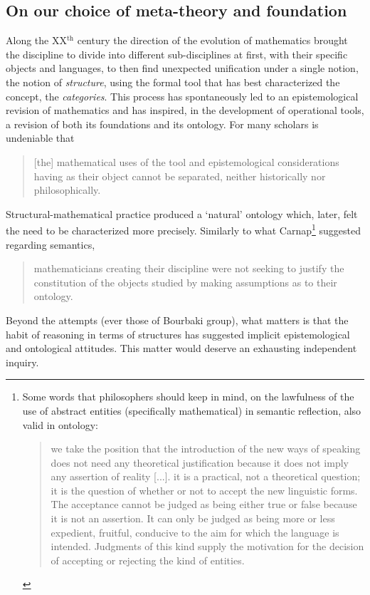 \subsection{On our choice of meta-theory and foundation}
Along the XX$^\text{th}$ century the direction of the evolution of mathematics brought the discipline to divide into different sub-disciplines at first, with their specific objects and languages, to then find unexpected unification under a single notion, the notion of \emph{structure}, using the formal tool that has best characterized the concept, the \emph{categories}. This process has spontaneously led to an epistemological revision of mathematics and has inspired, in the development of operational tools, a revision of both its foundations and its ontology. For many scholars is undeniable that
\begin{quote}
    [the] mathematical uses of the tool \CT and epistemological considerations having \CT as their object cannot be separated, neither historically nor philosophically. \cite{kromer2007tool}
\end{quote}
Structural-mathematical practice produced a `natural' ontology which, later, felt the need to be characterized more precisely. Similarly to what Carnap\footnote{Some words that philosophers should keep in mind, on the lawfulness of the use of abstract entities (specifically mathematical) in semantic reflection, also valid in ontology:
    \begin{quote}
        we take the position that the introduction of the new ways of speaking does not need any theoretical justification because it does not imply any assertion of reality [...].  it is a practical, not a theoretical question; it is the question of whether or not to accept the new linguistic forms. The acceptance cannot be judged as being either true or false because it is not an assertion. It can only be judged as being more or less expedient, fruitful, conducive to the aim for which the language is intended. Judgments of this kind supply the motivation for the decision of accepting or rejecting the kind of entities. \hfill \cite{carnap1956meaning}
    \end{quote}} suggested regarding semantics,
\begin{quote}
    mathematicians creating their discipline were not seeking to justify the constitution of the objects studied by making assumptions as to their ontology.\hfill  \cite{kromer2007tool}
\end{quote}
Beyond the attempts (ever those of Bourbaki group), what matters is that the habit of reasoning in terms of structures has suggested implicit epistemological and ontological attitudes. This matter would deserve an exhausting independent inquiry.

